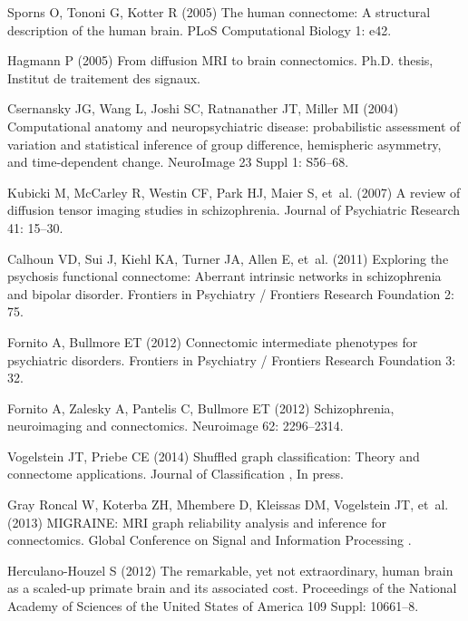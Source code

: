 \documentclass[10pt]{article}
\begin{document}
\begin{thebibliography}{10}
Sporns O, Tononi G, Kotter R (2005) {The human connectome: A structural
  description of the human brain}.
\newblock PLoS Computational Biology 1: e42.

Hagmann P (2005) {From diffusion MRI to brain connectomics}.
\newblock Ph.D. thesis, Institut de traitement des signaux.

Csernansky JG, Wang L, Joshi SC, Ratnanather JT, Miller MI (2004)
  {Computational anatomy and neuropsychiatric disease: probabilistic assessment
  of variation and statistical inference of group difference, hemispheric
  asymmetry, and time-dependent change.}
\newblock NeuroImage 23 Suppl 1: S56--68.

Kubicki M, McCarley R, Westin CF, Park HJ, Maier S, et~al. (2007) {A review of
  diffusion tensor imaging studies in schizophrenia.}
\newblock Journal of Psychiatric Research 41: 15--30.

Calhoun VD, Sui J, Kiehl KA, Turner JA, Allen E, et~al. (2011) {Exploring the
  psychosis functional connectome: Aberrant intrinsic networks in schizophrenia
  and bipolar disorder.}
\newblock Frontiers in Psychiatry / Frontiers Research Foundation 2: 75.

Fornito A, Bullmore ET (2012) {Connectomic intermediate phenotypes for
  psychiatric disorders.}
\newblock Frontiers in Psychiatry / Frontiers Research Foundation 3: 32.

Fornito A, Zalesky A, Pantelis C, Bullmore ET (2012) Schizophrenia,
  neuroimaging and connectomics.
\newblock Neuroimage 62: 2296--2314.

Vogelstein JT, Priebe CE (2014) {Shuffled graph classification: Theory and
  connectome applications}.
\newblock Journal of Classification , In press.

{Gray Roncal} W, Koterba ZH, Mhembere D, Kleissas DM, Vogelstein JT, et~al.
  (2013) {MIGRAINE: MRI graph reliability analysis and inference for
  connectomics}.
\newblock Global Conference on Signal and Information Processing .

Herculano-Houzel S (2012) {The remarkable, yet not extraordinary, human brain
  as a scaled-up primate brain and its associated cost.}
\newblock Proceedings of the National Academy of Sciences of the United States
  of America 109 Suppl: 10661--8.


\end{thebibliography}
\end{document}
